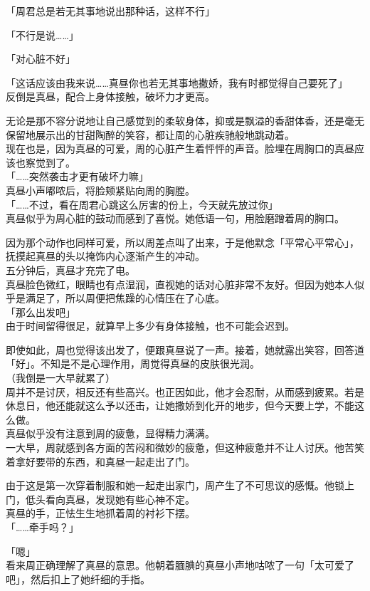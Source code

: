 「周君总是若无其事地说出那种话，这样不行」

「不行是说……」

「对心脏不好」

「这话应该由我来说……真昼你也若无其事地撒娇，我有时都觉得自己要死了」\\

反倒是真昼，配合上身体接触，破坏力才更高。

无论是那不容分说地让自己感觉到的柔软身体，抑或是飘溢的香甜体香，还是毫无保留地展示出的甘甜陶醉的笑容，都让周的心脏疾驰般地跳动着。\\

现在也是，因为真昼的可爱，周的心脏产生着怦怦的声音。脸埋在周胸口的真昼应该也察觉到了。\\

「……突然袭击才更有破坏力嘛」\\

真昼小声嘟哝后，将脸颊紧贴向周的胸膛。\\

「……不过，看在周君心跳这么厉害的份上，今天就先放过你」\\

真昼似乎为周心脏的鼓动而感到了喜悦。她低语一句，用脸磨蹭着周的胸口。

因为那个动作也同样可爱，所以周差点叫了出来，于是他默念「平常心平常心」，抚摸起真昼的头以掩饰内心逐渐产生的冲动。\\

五分钟后，真昼才充完了电。\\

真昼脸色微红，眼睛也有点湿润，直视她的话对心脏非常不友好。但因为她本人似乎是满足了，所以周便把焦躁的心情压在了心底。\\

「那么出发吧」\\

由于时间留得很足，就算早上多少有身体接触，也不可能会迟到。

即使如此，周也觉得该出发了，便跟真昼说了一声。接着，她就露出笑容，回答道「好」。不知是不是心理作用，周觉得真昼的皮肤很光润。\\

（我倒是一大早就累了）\\

周并不是讨厌，相反还有些高兴。也正因如此，他才会忍耐，从而感到疲累。若是休息日，他还能就这么予以还击，让她撒娇到化开的地步，但今天要上学，不能这么做。\\

真昼似乎没有注意到周的疲惫，显得精力满满。\\

一大早，周就感到各方面的苦闷和微妙的疲惫，但这种疲惫并不让人讨厌。他苦笑着拿好要带的东西，和真昼一起走出了门。

由于这是第一次穿着制服和她一起走出家门，周产生了不可思议的感慨。他锁上门，低头看向真昼，发现她有些心神不定。\\

真昼的手，正怯生生地抓着周的衬衫下摆。\\

「……牵手吗？」

「嗯」\\

看来周正确理解了真昼的意思。他朝着腼腆的真昼小声地咕哝了一句「太可爱了吧」，然后扣上了她纤细的手指。
